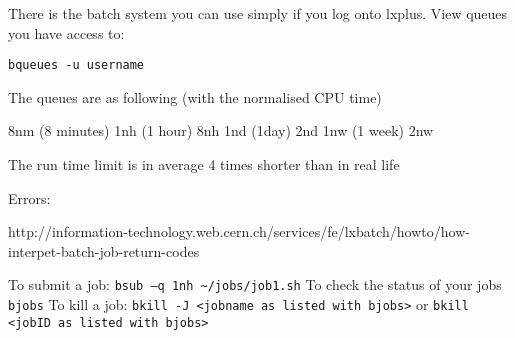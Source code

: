 There is the batch system you can use simply if you log onto lxplus. View queues you have access to:

\lstinline|bqueues -u username|

The queues are as following (with the normalised CPU time)

8nm (8 minutes)
1nh (1 hour)
8nh
1nd (1day)
2nd
1nw (1 week)
2nw

The run time limit is in average 4 times shorter than in real life

Errors:

http://information-technology.web.cern.ch/services/fe/lxbatch/howto/how-interpet-batch-job-return-codes

To submit a job: \lstinline|bsub –q 1nh ~/jobs/job1.sh|
To check the status of your jobs \lstinline|bjobs|
To kill a job: \lstinline|bkill -J <jobname as listed with bjobs>|
or \lstinline|bkill <jobID as listed with bjobs>|

